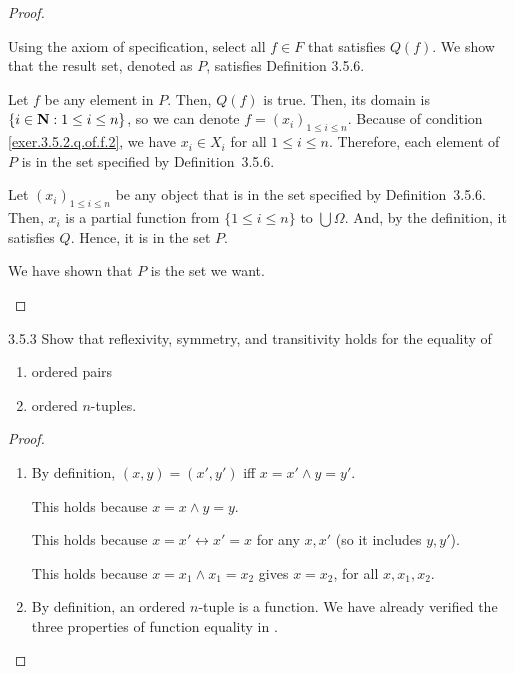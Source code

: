 \begin{proof}
\begin{enumerate}
		Using the axiom of specification, select all $f \in F$ that satisfies $Q(f)$. We show that the result set, denoted as $P$, satisfies Definition 3.5.6.
		
		Let $f$ be any element in $P$. Then, $Q(f)$ is true. Then, its domain is $\{i \in \mathbf{N} : 1 \le i \le n\}$, so we can denote $f = (x_i)_{1 \le i \le n}$. Because of condition \eqref{exer.3.5.2.q.of.f.2}, we have $x_i \in X_i$ for all $1 \le i \le n$. Therefore, each element of $P$ is in the set specified by Definition~3.5.6.
		
		Let $(x_i)_{1 \le i \le n}$ be any object that is in the set specified by Definition~3.5.6. Then, $x_i$ is a partial function from $\{1 \le i \le n\}$ to $\bigcup \Omega$. And, by the definition, it satisfies $Q$. Hence, it is in the set $P$.
		
		We have shown that $P$ is the set we want.
	\end{enumerate}
\end{proof}

\begin{exercise}{3.5.3}
	Show that reflexivity, symmetry, and transitivity holds for the equality of
	\begin{enumerate}
		\item ordered pairs
		\item ordered $n$-tuples.
	\end{enumerate}
\end{exercise}
\begin{proof}\leavevmode
	\begin{enumerate}
		\item By definition, $(x,y) = (x',y')$ iff $x = x' \wedge y = y'$.
		
		 This holds because $x = x \wedge y = y$.
		
		 This holds because $x = x' \leftrightarrow x' = x$ for any $x,x'$ (so it includes $y,y'$).
		
		 This holds because $x = x_1 \wedge x_1 = x_2$ gives $x = x_2$, for all $x,x_1,x_2$.
		
		\item By definition, an ordered $n$-tuple is a function. We have already verified the three properties of function equality in .
	\end{enumerate}
\end{proof}

